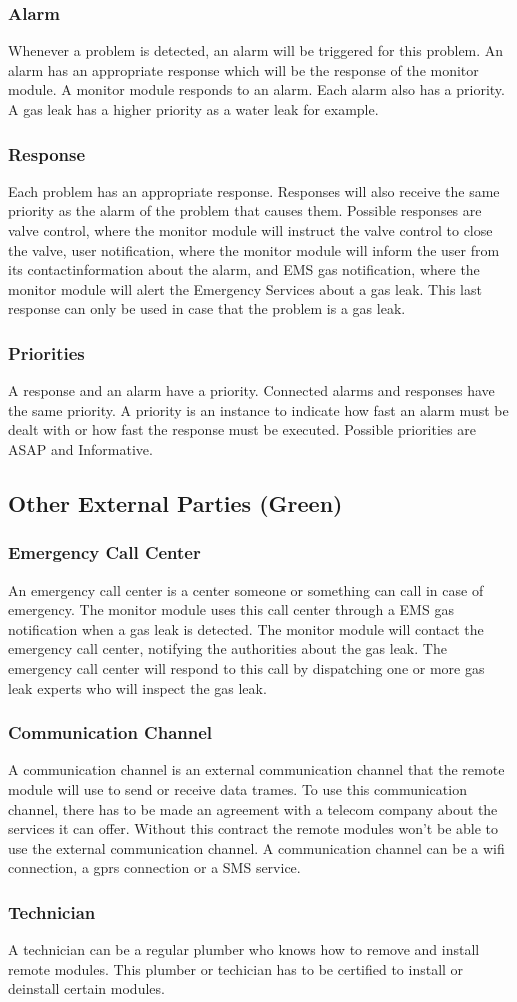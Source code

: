 \subsubsection{Alarm}
Whenever a problem is detected, an alarm will be triggered for this problem. An alarm has an appropriate response which will be the response of the monitor module. A monitor
module responds to an alarm. Each alarm also has a priority. A gas leak has a higher priority as a water leak for example. 
\subsubsection{Response}
Each problem has an appropriate response. Responses will also receive the same priority as the alarm of the problem that causes them. Possible responses are valve control, where the monitor module
will instruct the valve control to close the valve, user notification, where the monitor module will inform the user from its contactinformation about the alarm, and EMS gas
notification, where the monitor module will alert the Emergency Services about a gas leak. This last response can only be used in case that the problem is a gas leak.
\subsubsection{Priorities}
A response and an alarm have a priority. Connected alarms and responses have the same priority. A priority is an instance to indicate how fast an alarm must be dealt with or how
fast the response must be executed. Possible priorities are ASAP and Informative.
\subsection{Other External Parties (Green)}
\subsubsection{Emergency Call Center}
An emergency call center is a center someone or something can call in case of emergency. The monitor module uses this call center through a EMS gas notification when a gas
leak is detected. The monitor module will contact the emergency call center, notifying the authorities about the gas leak. The emergency call center will respond to this call by 
dispatching one or more gas leak experts who will inspect the gas leak.
\subsubsection{Communication Channel}
A communication channel is an external communication channel that the remote module will use to send or receive data trames. To use this communication channel, there has to be made an
agreement with a telecom company about the services it can offer. Without this contract the remote modules won't be able to use the external communication channel. A communication channel
can be a wifi connection, a gprs connection or a SMS service.
\subsubsection{Technician}
A technician can be a regular plumber who knows how to remove and install remote modules. This plumber or techician has to be certified to install or deinstall certain modules.
